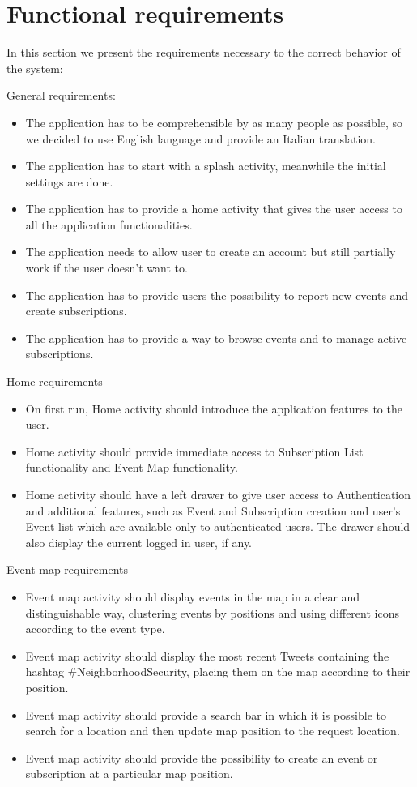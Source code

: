 \documentclass[a4paper]{scrreprt}
\begin{document}
\section{Functional requirements}
In this section we present the requirements necessary to the correct behavior of the system:

\bigskip\underline{General requirements:}
\begin{itemize}
\item The application has to be comprehensible by as many people as possible, so we decided to use English language and provide an Italian translation.
\item The application has to start with a splash activity, meanwhile the initial settings are done.
\item The application has to provide a home activity that gives the user access to all the application functionalities.
\item The application needs to allow user to create an account but still partially work if the user doesn't want to.
\item The application has to provide users the possibility to report new events and create subscriptions.
\item The application has to provide a way to browse events and to manage active subscriptions.
\end{itemize}

\pagebreak
\underline{Home requirements}
\begin{itemize}
\item On first run, Home activity should introduce the application features to the user.
\item Home activity should provide immediate access to Subscription List functionality and Event Map functionality.
\item Home activity should have a left drawer to give user access to Authentication and additional features, such as Event and Subscription creation and user's Event list which are available only to authenticated users. The drawer should also display the current logged in user, if any.
\end{itemize}

\underline{Event map requirements}
\begin{itemize}
\item Event map activity should display events in the map in a clear and distinguishable way, clustering events by positions and using different icons according to the event type.
\item Event map activity should display the most recent Tweets containing the hashtag \#NeighborhoodSecurity, placing them on the map according to their position.
\item Event map activity should provide a search bar in which it is possible to search for a location and then update map position to the request location.
\item Event map activity should provide the possibility to create an event or subscription at a particular map position.
\end{itemize}
\end{document}
